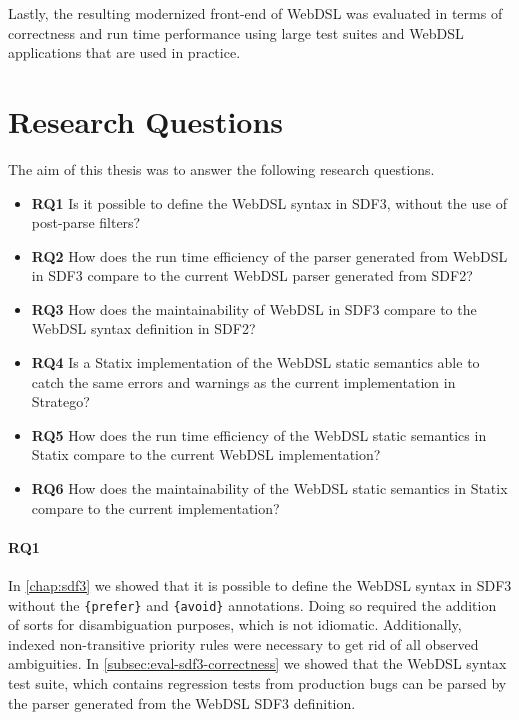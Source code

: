   Lastly, the resulting modernized front-end of WebDSL was evaluated in terms of correctness and run time performance using large test suites and WebDSL applications that are used in practice.

  \section{\label{sec:answering-research-questions}Research Questions}

    The aim of this thesis was to answer the following research questions.

    \begin{itemize}
      \item \textbf{RQ1} Is it possible to define the WebDSL syntax in SDF3, without the use of post-parse filters?
      \item \textbf{RQ2} How does the run time efficiency of the parser generated from WebDSL in SDF3 compare to the current WebDSL parser generated from SDF2?
      \item \textbf{RQ3} How does the maintainability of WebDSL in SDF3 compare to the WebDSL syntax definition in SDF2?
      \item \textbf{RQ4} Is a Statix implementation of the WebDSL static semantics able to catch the same errors and warnings as the current implementation in Stratego?
      \item \textbf{RQ5} How does the run time efficiency of the WebDSL static semantics in Statix compare to the current WebDSL implementation?
      \item \textbf{RQ6} How does the maintainability of the WebDSL static semantics in Statix compare to the current implementation?
    \end{itemize}

    \paragraph{RQ1} In \cref{chap:sdf3} we showed that it is possible to define the WebDSL syntax in SDF3 without the \texttt{\{prefer\}} and \texttt{\{avoid\}} annotations. Doing so required the addition of sorts for disambiguation purposes, which is not idiomatic. Additionally, indexed non-transitive priority rules were necessary to get rid of all observed ambiguities. In \cref{subsec:eval-sdf3-correctness} we showed that the WebDSL syntax test suite, which contains regression tests from production bugs can be parsed by the parser generated from the WebDSL SDF3 definition.

